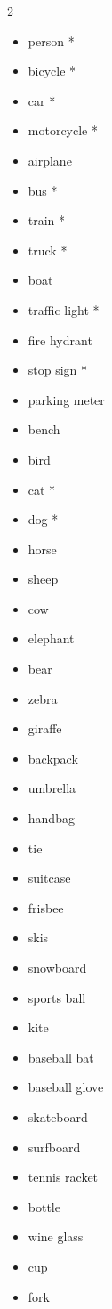 \documentclass[12pt]{article}
\begin{document}
\begin{multicols}{2}
\begin{itemize}
    \item person *
    \item bicycle *
    \item car *
    \item motorcycle *
    \item airplane
    \item bus *
    \item train *
    \item truck *
    \item boat
    \item traffic light *
    \item fire hydrant
    \item stop sign *
    \item parking meter
    \item bench
    \item bird
    \item cat *
    \item dog *
    \item horse
    \item sheep
    \item cow
    \item elephant
    \item bear
    \item zebra
    \item giraffe
    \item backpack
    \item umbrella
    \item handbag
    \item tie
    \item suitcase
    \item frisbee
    \item skis
    \item snowboard
    \item sports ball
    \item kite
    \item baseball bat
    \item baseball glove
    \item skateboard
    \item surfboard
    \item tennis racket
    \item bottle
    \item wine glass
    \item cup
    \item fork

\end{itemize}
\end{multicols}
\end{document}
